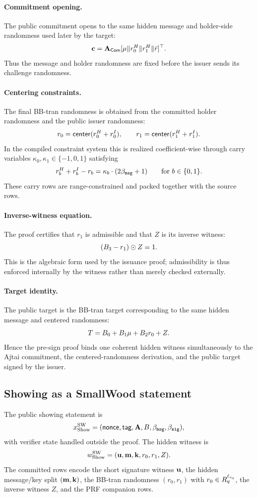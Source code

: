 \paragraph{Commitment opening.}
The public commitment opens to the same hidden message and holder-side randomness used later by the target:
\[
  \mathbf{c}=\mathbf{A}_{\mathsf{Com}}[\mathbf{\mu}\Vert r_0^H\Vert r_1^H\Vert \bar r]^\top.
\]
Thus the message and holder randomness are fixed before the issuer sends its challenge randomness.

\paragraph{Centering constraints.}
The final BB-tran randomness is obtained from the committed holder randomness and the public issuer randomness:
\[
  r_0=\mathsf{center}(r_0^H+r_0^I),
  \qquad
  r_1=\mathsf{center}(r_1^H+r_1^I).
\]
In the compiled constraint system this is realized coefficient-wise through carry variables
$\kappa_0,\kappa_1\in\{-1,0,1\}$ satisfying
\[
  r_b^H+r_b^I-r_b=\kappa_b\cdot(2\beta_{\mathtt{msg}}+1)
  \qquad\text{for }b\in\{0,1\}.
\]
These carry rows are range-constrained and packed together with the source rows.

\paragraph{Inverse-witness equation.}
The proof certifies that $r_1$ is admissible and that $Z$ is its inverse witness:
\[
  (B_3-r_1)\odot Z=1.
\]
This is the algebraic form used by the issuance proof; admissibility is thus enforced internally by the witness
rather than merely checked externally.

\paragraph{Target identity.}
The public target is the BB-tran target corresponding to the same hidden message and centered randomness:
\[
  T=B_0+B_1\mathbf{\mu}+B_2r_0+Z.
\]
Hence the pre-sign proof binds one coherent hidden witness simultaneously to the Ajtai commitment, the
centered-randomness derivation, and the public target signed by the issuer.

\subsection{Showing as a SmallWood statement}
\label{subsec:smallwood-showing}
\label{subsec:showing-compiled}
The public showing statement is
\[
  x^{\mathrm{SW}}_{\mathrm{Show}}=(\mathsf{nonce},\mathsf{tag},\mathbf{A},B,\beta_{\mathtt{msg}},\beta_{\mathtt{sig}}),
\]
with verifier state handled outside the proof.  The hidden witness is
\[
  w^{\mathrm{SW}}_{\mathrm{Show}}=(\mathbf{u},\mathbf{m},\mathbf{k},r_0,r_1,Z).
\]
The committed rows encode the short signature witness $\mathbf{u}$, the hidden message/key split $(\mathbf{m},\mathbf{k})$,
the BB-tran randomness $(r_0,r_1)$ with $r_0\in R_q^{\ell_{r_0}}$, the inverse witness $Z$, and the PRF companion rows.


